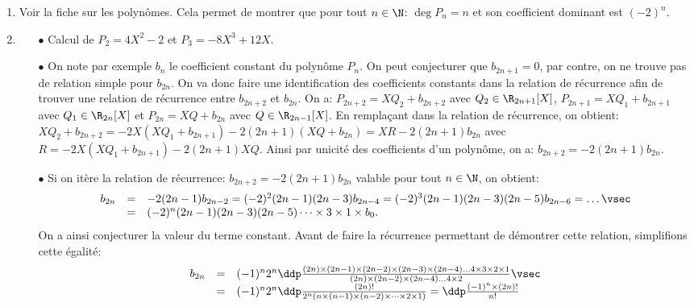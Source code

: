 \documentclass[a4paper, 11pt,reqno]{article}
\begin{document}
\begin{correction}
	\begin{enumerate}
		\item Voir la fiche sur les polyn\^{o}mes. Cela permet de montrer que pour tout $n\in\N$: $\deg{P_n}=n$ et son coefficient dominant est $(-2)^n$.
		\item
		      \begin{itemize}
			      \item[$\bullet$] Calcul de $P_2=4X^2-2$ et $P_3=-8X^3+12X$.
			      \item[$\bullet$] On note par exemple $b_n$ le coefficient constant du polyn\^{o}me $P_n$. On peut conjecturer que $b_{2n+1}=0$, par contre, on ne trouve pas de relation simple pour $b_{2n}$. On va donc faire une identification des coefficients constants dans la relation de r\'ecurrence afin de trouver une relation de r\'ecurrence entre $b_{2n+2}$ et $b_{2n}$. On a: $P_{2n+2}=XQ_2+b_{2n+2}$ avec $Q_2\in\R_{2n+1}\lbrack X\rbrack$, $P_{2n+1}=XQ_1+b_{2n+1}$ avec $Q_1\in\R_{2n}\lbrack X\rbrack$ et $P_{2n}=XQ+b_{2n}$ avec $Q\in\R_{2n-1}\lbrack X\rbrack$. En rempla\c{c}ant dans la relation de r\'ecurrence, on obtient: $XQ_2+b_{2n+2}=-2X(XQ_1+b_{2n+1})-2(2n+1)(XQ+b_{2n})=XR-2(2n+1)b_{2n}$ avec $R=-2X(XQ_1+b_{2n+1})-2(2n+1)XQ$. Ainsi par unicit\'e des coefficients d'un polyn\^{o}me, on a: $b_{2n+2}=-2(2n+1)b_{2n}$.
			      \item[$\bullet$] Si on it\`{e}re la relation de r\'ecurrence: $b_{2n+2}=-2(2n+1)b_{2n}$ valable pour tout $n\in\N$, on obtient:
			            $$\begin{array}{lll} b_{2n} & = & -2(2n-1)b_{2n-2}=(-2)^2 (2n-1)(2n-3)b_{2n-4}=(-2)^3 (2n-1)(2n-3)(2n-5)b_{2n-6}=\dots\vsec \\
                          & = & (-2)^n (2n-1)(2n-3)(2n-5)\dots \times 3\times 1  \times b_0.\end{array}$$
			            On a ainsi conjecturer la valeur du terme constant. Avant de faire la r\'ecurrence permettant de d\'emontrer cette relation, simplifions cette \'egalit\'e:
			            $$\begin{array}{lll} b_{2n} & = & (-1)^n 2^n \ddp\frac{ (2n)\times (2n-1)\times (2n-2)\times (2n-3)\times (2n-4)\dots 4\times 3\times 2\times 1  }{ (2n)\times (2n-2)\times (2n-4)\dots 4\times 2   }\vsec \\
                          & = & (-1)^n 2^n \ddp\frac{(2n)!}{ 2^n( n\times (n-1)\times (n-2)\times\dots \times 2\times 1  )  }=\ddp\frac{(-1)^n\times (2n)!}{n!}\end{array}$$

\end{itemize}
\end{enumerate}
\end{correction}
\end{document}
